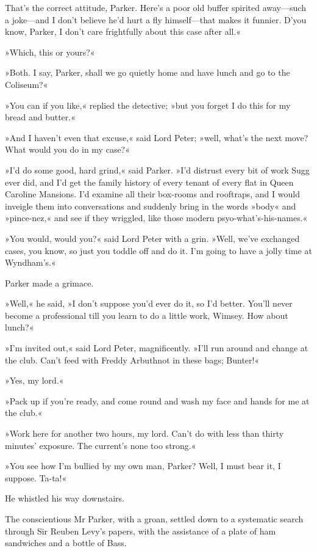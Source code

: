 That's the correct attitude, Parker. Here's a poor old buffer spirited away\allowbreak---\allowbreak such a joke\allowbreak---\allowbreak and I don't believe he'd hurt a fly himself\allowbreak---\allowbreak that makes it funnier. D'you know, Parker, I don't care frightfully about this case after all.«

»Which, this or yours?«

»Both. I say, Parker, shall we go quietly home and have lunch and go to the Coliseum?«

»You can if you like,« replied the detective; »but you forget I do this for my bread and butter.«

»And I haven't even that excuse,« said Lord Peter; »well, what's the next move? What would you do in my case?«

»I'd do some good, hard grind,« said Parker. »I'd distrust every bit of work Sugg ever did, and I'd get the family history of every tenant of every flat in Queen Caroline Mansions. I'd examine all their box-rooms and rooftraps, and I would inveigle them into conversations and suddenly bring in the words »body« and »pince-nez,« and see if they wriggled, like those modern psyo-what's-his-names.«

»You would, would you?« said Lord Peter with a grin. »Well, we've exchanged cases, you know, so just you toddle off and do it. I'm going to have a jolly time at Wyndham's.«

Parker made a grimace.

»Well,« he said, »I don't suppose you'd ever do it, so I'd better. You'll never become a professional till you learn to do a little work, Wimsey. How about lunch?«

»I'm invited out,« said Lord Peter, magnificently. »I'll run around and change at the club. Can't feed with Freddy Arbuthnot in these bags; Bunter!«

»Yes, my lord.«

»Pack up if you're ready, and come round and wash my face and hands for me at the club.«

»Work here for another two hours, my lord. Can't do with less than thirty minutes' exposure. The current's none too strong.«

»You see how I'm bullied by my own man, Parker? Well, I must bear it, I suppose. Ta-ta!«

He whistled his way downstairs.

The conscientious Mr Parker, with a groan, settled down to a systematic search through Sir Reuben Levy's papers, with the assistance of a plate of ham sandwiches and a bottle of Bass.

